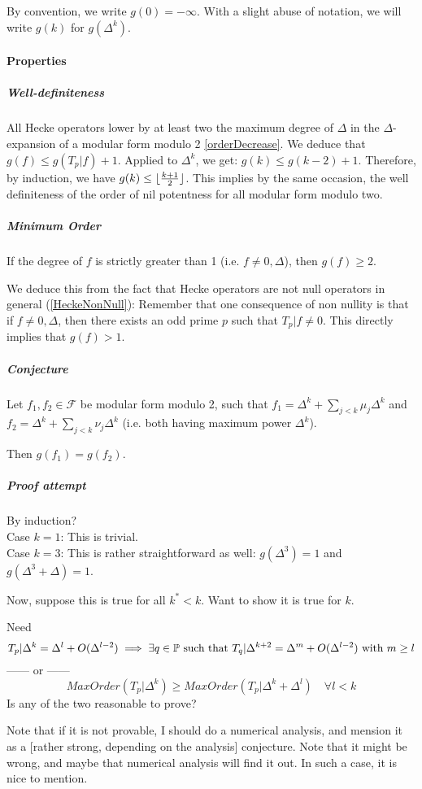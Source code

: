 By convention, we write $g(0)= -\infty$.
With a slight abuse of notation, we will write $g(k)$ for $g(\Delta^k)$.

\paragraph{Properties}
\subparagraph{Well-definiteness}
All Hecke operators lower by at least two the maximum degree of $\Delta$ in the $\Delta$-expansion of a modular form modulo 2 \ref{orderDecrease}.
We deduce that $g(f) \leq g(T_p|f) + 1$.
Applied to $\Delta^k$, we get: $g(k) \leq g(k-2) + 1$.
Therefore, by induction, we have $g(k) \leq \lfloor \frac{k+1}{2} \rfloor$.
This implies by the same occasion, the well definiteness of the order of nil potentness for all modular form modulo two.

\subparagraph{Minimum Order}
If the degree of $f$ is strictly greater than 1 (i.e. $f \neq 0, \Delta$), then $g(f) \geq 2$.

We deduce this from the fact that Hecke operators are not null operators in general (\ref{HeckeNonNull}):
Remember that one consequence of non nullity is that if $f \neq 0, \Delta$, then there exists an odd prime $p$ such that $T_p|f \neq 0$.
This directly implies that $g(f) > 1$.

\subparagraph{Conjecture}
Let $f_1,f_2 \in \mathcal{F}$ be modular form modulo 2, such that
$f_1 = \Delta^k + \sum_{j < k} \mu_j \Delta^k$
and
$f_2 = \Delta^k + \sum_{j < k} \nu_j \Delta^k$
(i.e. both having maximum power $\Delta^k$).

Then $g(f_1)=g(f_2)$.

\subparagraph{Proof attempt}
By induction?\\
Case $k=1$: This is trivial.\\
Case $k=3$: This is rather straightforward as well: $g(\Delta^3)=1$ and $g(\Delta^3+\Delta)=1$.

Now, suppose this is true for all $k^* < k$.
Want to show it is true for $k$.

Need 
$$
T_p|\Delta^k = \Delta^l + O(\Delta^{l-2}) 
\implies
\exists q \in \mathbb{P} \text{ such that } 
T_q|\Delta^{k+2}=\Delta^m + O(\Delta^{l-2}) 
\text{ with } m \geq l
$$
------ or ------
$$
MaxOrder(T_p|\Delta^k) \geq MaxOrder(T_p|\Delta^k+\Delta^l)
\quad \forall l<k
$$
Is any of the two reasonable to prove?


Note that if it is not provable, I should do a numerical analysis, and mension it as a [rather strong, depending on the analysis] conjecture.
Note that it might be wrong, and maybe that numerical analysis will find it out. In such a case, it is nice to mention.

